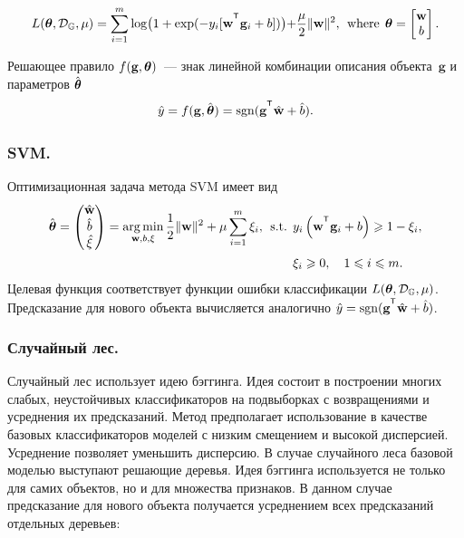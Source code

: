 \begin{equation*}
	L(\btheta, \mathcal{D}_\mathbb{G}, \mu) = \sum_{i=1}^{m} \log\bigl(1 + \exp(-y_i [\mathbf{w}^{\T} \mathbf{g}_i + b])\bigl) + \frac{\mu}{2} \|\mathbf{w}\|^2, \:\:\mbox{where}\:\: \btheta  = \begin{bmatrix}
	\mathbf{w} \\ b
	\end{bmatrix}.
\end{equation*}

Решающее правило $f(\mathbf{g}, \boldsymbol{\theta})$~--- знак линейной комбинации описания объекта~$\mathbf{g}$ и параметров $\hat{\boldsymbol{\theta}}$
\begin{equation*}
	\hat{y} = f(\mathbf{g}, \hat{\btheta}) = \sgn(\mathbf{g}^{\T} \hat{\mathbf{w}} + \hat{b}).
\end{equation*}

\subsubsection{SVM.}
Оптимизационная задача метода SVM имеет вид
\begin{align*}
	\hat{\btheta}  = \begin{pmatrix}
	\hat{\mathbf{w}} \\ \hat{b} \\ \hat{\mathbf{\xi}}
	\end{pmatrix}= \argmin_{\mathbf{w}, b, \mathbf{\xi}}  \frac{1}{2} \|\mathbf{w}\|^2 + \mu \sum_{i=1}^{m} \xi_i,\:\:
	\mbox{s.t.} \:\: &y_i \left(\mathbf{w}^{\T} \mathbf{g}_i + b\right) \geq 1 - \xi_i,\\
	&\xi_i \geq 0, \quad 1 \leq i \leq m.
\end{align*}
Целевая функция соответствует функции ошибки классификации $L(\boldsymbol{\theta}, \mathcal{D}_\mathbb{G}, \mu)$.
Предсказание для нового объекта вычисляется аналогично $
\hat{y} = \sgn (\mathbf{g}^{\T} \hat{\mathbf{w}} + \hat{b})$.

\subsubsection{Случайный лес.}
Случайный лес использует идею бэггинга. 
Идея состоит в построении многих слабых, неустойчивых классификаторов на подвыборках с возвращениями и усреднения их предсказаний.
Метод предполагает использование в качестве базовых классификаторов моделей с низким смещением и высокой дисперсией. 
Усреднение позволяет уменьшить дисперсию.
В случае случайного леса базовой моделью выступают решающие деревья. Идея бэггинга используется не только для самих объектов, но и для множества признаков.
В данном случае предсказание для нового объекта получается усреднением всех предсказаний отдельных деревьев:

